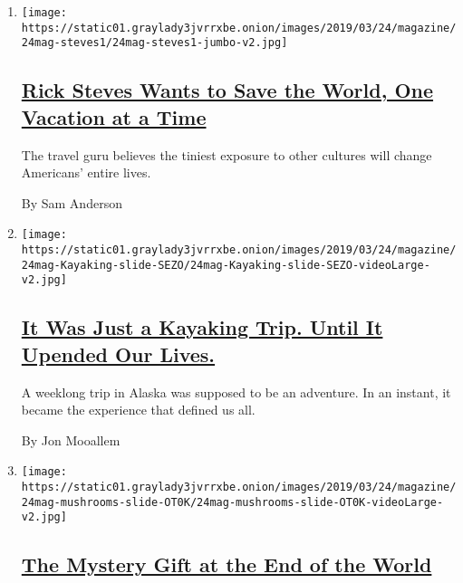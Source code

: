 \begin{enumerate}
\def\labelenumi{\arabic{enumi}.}
\item
  \texttt{[image: https://static01.graylady3jvrrxbe.onion/images/2019/03/24/magazine/24mag-steves1/24mag-steves1-jumbo-v2.jpg]}

  \hypertarget{rick-steves-wants-to-save-the-world-one-vacation-at-a-time}{%
  \subsection{\texorpdfstring{\href{/interactive/2019/03/20/magazine/rick-steves-travel-world.html}{Rick
  Steves Wants to Save the World, One Vacation at a
  Time}}{Rick Steves Wants to Save the World, One Vacation at a Time}}\label{rick-steves-wants-to-save-the-world-one-vacation-at-a-time}}

  The travel guru believes the tiniest exposure to other cultures will
  change Americans' entire lives.

  By Sam Anderson
\item
  \texttt{[image: https://static01.graylady3jvrrxbe.onion/images/2019/03/24/magazine/24mag-Kayaking-slide-SEZO/24mag-Kayaking-slide-SEZO-videoLarge-v2.jpg]}

  \hypertarget{it-was-just-a-kayaking-trip-until-it-upended-our-lives}{%
  \subsection{\texorpdfstring{\href{/interactive/2019/03/20/magazine/kayaking-trip-alaska.html}{It
  Was Just a Kayaking Trip. Until It Upended Our
  Lives.}}{It Was Just a Kayaking Trip. Until It Upended Our Lives.}}\label{it-was-just-a-kayaking-trip-until-it-upended-our-lives}}

  A weeklong trip in Alaska was supposed to be an adventure. In an
  instant, it became the experience that defined us all.

  By Jon Mooallem
\item
  \texttt{[image: https://static01.graylady3jvrrxbe.onion/images/2019/03/24/magazine/24mag-mushrooms-slide-OT0K/24mag-mushrooms-slide-OT0K-videoLarge-v2.jpg]}

  \hypertarget{the-mystery-gift-at-the-end-of-the-world}{%
  \subsection{\texorpdfstring{\href{/interactive/2019/03/21/magazine/mushrooms-sweden-island.html}{The
  Mystery Gift at the End of the
  World}}{The Mystery Gift at the End of the World}}\label{the-mystery-gift-at-the-end-of-the-world}}


\end{enumerate}
